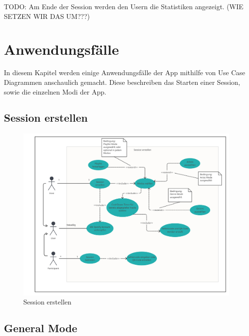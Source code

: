 \documentclass[oneside, ngerman]{sdqtechreport}
\begin{document}
TODO: Am Ende der Session werden den Usern die Statistiken angezeigt. (WIE SETZEN WIR DAS UM???)






\chapter{Anwendungsfälle}
\label{chap:Anwendungsfälle}

In diesem Kapitel werden einige Anwendungsfälle der App mithilfe von Use Case Diagrammen anschaulich gemacht. Diese beschreiben das Starten einer Session, sowie die einzelnen Modi der App.

\section{Session erstellen}
\label{sec:Anwendungsfälle:Session erstellen}

\begin{figure}[h]
   \hypertarget{Anwendungsfaelle}{}
    \includegraphics[width = 16cm]{LATEX/Pflichtenheft/GraphicDesigns/Use Case Session erstellen.png}
    \caption{Session erstellen}
    \label{fig:Use Case App Start}
\end{figure}

\newpage

\section{General Mode}
\label{sec:Anwendungsfälle:GeneralMode}
\end{document}

